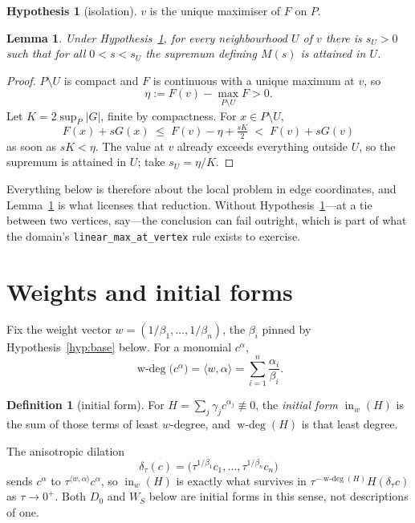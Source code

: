 \documentclass[11pt]{article}
\newtheorem{lemma}[theorem]{Lemma}
\theoremstyle{definition}
\newtheorem{hypothesis}{Hypothesis}
\newtheorem{definition}{Definition}
\theoremstyle{remark}
\DeclareMathOperator*{\wdeg}{w\text{-}deg}
\newcommand{\inw}{\operatorname{in}_w}
\begin{document}
\begin{hypothesis}[isolation]\label{hyp:iso}
$v$ is the unique maximiser of $F$ on $P$.
\end{hypothesis}

\begin{lemma}\label{lem:isolation}
Under Hypothesis~\ref{hyp:iso}, for every neighbourhood $U$ of $v$ there is
$s_U>0$ such that for all $0<s<s_U$ the supremum defining $M(s)$ is attained
in $U$.
\end{lemma}

\begin{proof}
$P\setminus U$ is compact and $F$ is continuous with a unique maximum at $v$,
so
\[
  \eta:=F(v)-\max_{P\setminus U}F>0 .
\]
Let $K=2\sup_P|G|$, finite by compactness. For $x\in P\setminus U$,
\[
  F(x)+sG(x)\;\le\;F(v)-\eta+\tfrac{sK}{2}\;<\;F(v)+sG(v)
\]
as soon as $sK<\eta$. The value at $v$ already exceeds everything outside
$U$, so the supremum is attained in $U$; take $s_U=\eta/K$.
\end{proof}

Everything below is therefore about the local problem in edge coordinates, and
Lemma~\ref{lem:isolation} is what licenses that reduction. Without
Hypothesis~\ref{hyp:iso}---at a tie between two vertices, say---the conclusion
can fail outright, which is part of what the domain's
\texttt{linear\_max\_at\_vertex} rule exists to exercise.

\section{Weights and initial forms}

Fix the weight vector $w=(1/\beta_1,\dots,1/\beta_n)$, the $\beta_i$ pinned by
Hypothesis~\ref{hyp:base} below. For a monomial $c^{\alpha}$,
\[
  \wdeg\bigl(c^{\alpha}\bigr)=\langle w,\alpha\rangle
  =\sum_{i=1}^{n}\frac{\alpha_i}{\beta_i}.
\]

\begin{definition}[initial form]
For $H=\sum_j\gamma_jc^{\alpha_j}\not\equiv0$, the \emph{initial form}
$\inw(H)$ is the sum of those terms of least $w$-degree, and $\wdeg(H)$ is
that least degree.
\end{definition}

The anisotropic dilation
\[
  \delta_\tau(c)=\bigl(\tau^{1/\beta_1}c_1,\dots,\tau^{1/\beta_n}c_n\bigr)
\]
sends $c^{\alpha}$ to $\tau^{\langle w,\alpha\rangle}c^{\alpha}$, so $\inw(H)$
is exactly what survives in $\tau^{-\wdeg(H)}H(\delta_\tau c)$ as
$\tau\to0^+$. Both $D_0$ and $W_S$ below are initial forms in this sense,
not descriptions of one.
\end{document}
